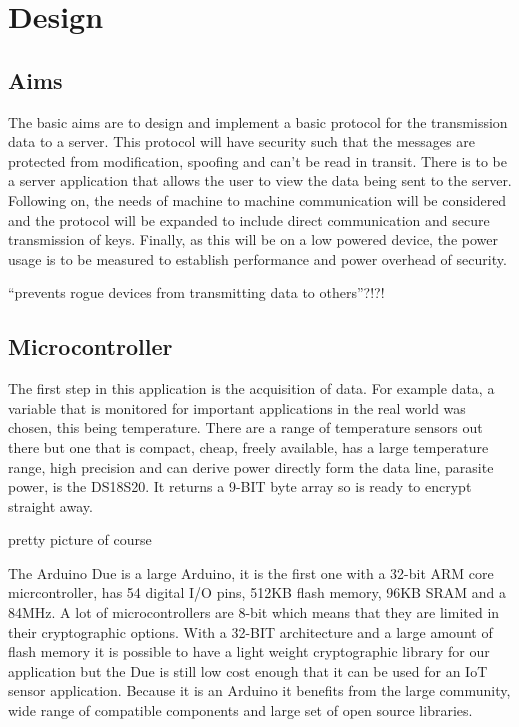 
\chapter{Design}
\label{design}

\section{Aims}

The basic aims are to design and implement a basic protocol for the transmission data to a server. This protocol will have security such that the messages are protected from modification, spoofing and can't be read in transit. There is to be a server application that allows the user to view the data being sent to the server.
Following on, the needs of machine to machine communication will be considered and the protocol will be expanded to include direct communication and secure transmission of keys. Finally, as this will be on a low powered device, the power usage is to be measured to establish performance and power overhead of security. 

``prevents rogue devices from transmitting data to others''?!?!

\section{Microcontroller}

The first step in this application is the acquisition of data. For example data, a variable that is monitored for important applications in the real world was chosen, this being temperature. There are a range of temperature sensors out there but one that is compact, cheap, freely available, has a large temperature range, high precision and can derive power directly form the data line, parasite power, is the DS18S20. It returns a 9-BIT byte array so is ready to encrypt straight away. 

pretty picture of course

The Arduino Due is a large Arduino, it is the first one with a 32-bit ARM core micrcontroller, has 54 digital I/O pins, 512KB flash memory, 96KB SRAM and a 84MHz. 
A lot of microcontrollers are 8-bit which means that they are limited in their cryptographic options. With a 32-BIT architecture and a large amount of flash memory it is possible to have a light weight cryptographic library for our application but the Due is still low cost enough that it can be used for an IoT sensor application. Because it is an Arduino it benefits from the large community, wide range of compatible components and large set of open source libraries.

